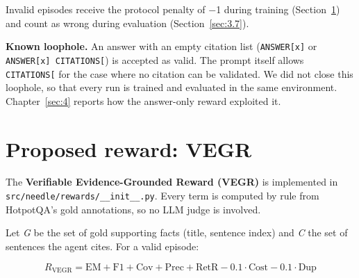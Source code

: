 Invalid episodes receive the protocol penalty of −1 during training
(Section~\ref{sec:3.4}) and count as wrong during evaluation
(Section~\ref{sec:3.7}).

\textbf{Known loophole.} An answer with an empty citation list
(\texttt{ANSWER{[}\allowbreak{}x{]}} or
\texttt{ANSWER{[}\allowbreak{}x{]} CITATIONS{[}\allowbreak{}{]}}) is
accepted as valid. The prompt itself allows
\texttt{CITATIONS{[}\allowbreak{}{]}} for the case where no citation can
be validated. We did not close this loophole, so that every run is
trained and evaluated in the same environment. Chapter~\ref{sec:4}
reports how the answer-only reward exploited it.

\section{Proposed reward: VEGR}\label{sec:3.4}

The \textbf{Verifiable Evidence-Grounded Reward (VEGR)} is implemented
in
\texttt{src/\allowbreak{}needle/\allowbreak{}rewards/\allowbreak{}\_\allowbreak{}\_\allowbreak{}init\_\allowbreak{}\_\allowbreak{}.\allowbreak{}py}.
Every term is computed by rule from HotpotQA's gold annotations, so no
LLM judge is involved.

Let \emph{G} be the set of gold supporting facts (title, sentence index)
and \emph{C} the set of sentences the agent cites. For a valid episode:

\[
R_{\text{VEGR}} = \text{EM} + \text{F1} + \text{Cov} + \text{Prec} + \text{RetR} - 0.1\cdot\text{Cost} - 0.1\cdot\text{Dup}
\]


